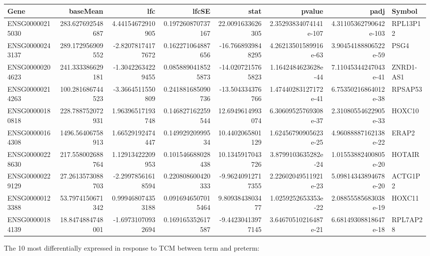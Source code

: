 \begin{center}
\begin{tabular}{lrrrrrrl}
Gene & baseMean & lfc & lfcSE & stat & pvalue & padj & Symbol\\
\hline
ENSG00000215030 & 283.627692548687 & 4.44154672910905 & 0.197260870737167 & 22.0091633626305 & 2.35293834074141e-107 & 4.31105362790642e-103 & RPL13P12\\
ENSG00000243137 & 289.172956909552 & -2.82078174177672 & 0.162271064887656 & -16.7668939848295 & 4.26213501589916e-63 & 3.90454188806522e-59 & PSG4\\
ENSG00000204623 & 241.333386629181 & -1.30422634229455 & 0.0858890418525873 & -14.0207215765823 & 1.1642484623628e-44 & 7.11045344247043e-41 & ZNRD1-AS1\\
ENSG00000214263 & 100.281686744523 & -3.3664511550809 & 0.241881685090736 & -13.504334376766 & 1.47440283127172e-41 & 6.75350216864012e-38 & RPSAP53\\
ENSG00000180818 & 228.788752072931 & 1.96396517193748 & 0.146827162259544 & 12.6949614993074 & 6.30609525769308e-37 & 2.31080554622905e-33 & HOXC10\\
ENSG00000164308 & 1496.56406758913 & 1.66529192474447 & 0.14992920999534 & 10.4402065801129 & 1.62456790905623e-25 & 4.96088887162138e-22 & ERAP2\\
ENSG00000228630 & 217.558002688764 & 1.12913422209953 & 0.101546688028438 & 10.1345917043726 & 3.8799103635282e-24 & 1.01553882400805e-20 & HOTAIR\\
ENSG00000229129 & 27.2613573088703 & -2.29978561618594 & 0.220808600420333 & -9.96240912717355 & 2.22602049511921e-23 & 5.09814343894678e-20 & ACTG1P2\\
ENSG00000123388 & 53.7974150671342 & 0.999468074353188 & 0.0916946507015464 & 9.8093843803477 & 1.0259252653353e-22 & 2.08855585683038e-19 & HOXC11\\
ENSG00000184139 & 18.8474884748001 & -1.69731070932694 & 0.169165352617587 & -9.44230413977145 & 3.64670510216487e-21 & 6.68149308818647e-18 & RPL7AP28\\
\end{tabular}
\end{center}


The 10 most differentially expressed in response to TCM between term and preterm:


